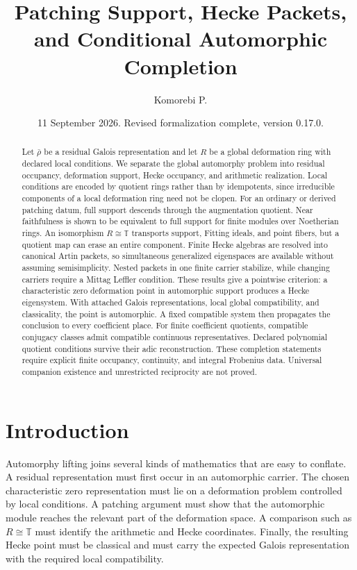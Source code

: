 \documentclass[11pt]{amsart}
\title[Patching support and automorphic completion]{Patching Support, Hecke Packets, and Conditional Automorphic Completion}
\author[Komorebi P.]{Komorebi P.}
\date{11 September 2026. Revised formalization complete, version 0.17.0.}
\theoremstyle{definition}
\theoremstyle{remark}
\newcommand{\TT}{\mathbb T}
\begin{document}
\begin{abstract}
Let \(\bar\rho\) be a residual Galois representation and let \(R\) be a global deformation ring with declared local conditions. We separate the global automorphy problem into residual occupancy, deformation support, Hecke occupancy, and arithmetic realization. Local conditions are encoded by quotient rings rather than by idempotents, since irreducible components of a local deformation ring need not be clopen. For an ordinary or derived patching datum, full support descends through the augmentation quotient. Near faithfulness is shown to be equivalent to full support for finite modules over Noetherian rings. An isomorphism \(R\cong\TT\) transports support, Fitting ideals, and point fibers, but a quotient map can erase an entire component. Finite Hecke algebras are resolved into canonical Artin packets, so simultaneous generalized eigenspaces are available without assuming semisimplicity. Nested packets in one finite carrier stabilize, while changing carriers require a Mittag Leffler condition. These results give a pointwise criterion: a characteristic zero deformation point in automorphic support produces a Hecke eigensystem. With attached Galois representations, local global compatibility, and classicality, the point is automorphic. A fixed compatible system then propagates the conclusion to every coefficient place. For finite coefficient quotients, compatible conjugacy classes admit compatible continuous representatives. Declared polynomial quotient conditions survive their adic reconstruction. These completion statements require explicit finite occupancy, continuity, and integral Frobenius data. Universal companion existence and unrestricted reciprocity are not proved.
\end{abstract}
\maketitle
\thispagestyle{plain}

\section{Introduction}\label{sec:introduction}

Automorphy lifting joins several kinds of mathematics that are easy to conflate. A residual representation must first occur in an automorphic carrier. The chosen characteristic zero representation must lie on a deformation problem controlled by local conditions. A patching argument must show that the automorphic module reaches the relevant part of the deformation space. A comparison such as \(R\cong\TT\) must identify the arithmetic and Hecke coordinates. Finally, the resulting Hecke point must be classical and must carry the expected Galois representation with the required local compatibility.
\end{document}
